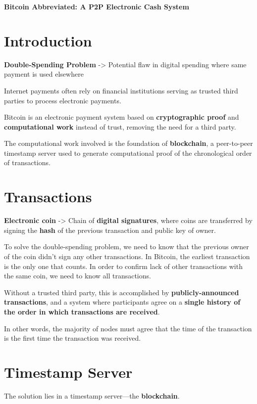 \documentclass[11pt, letterpaper]{template}
\begin{document}
{\LARGE\bfseries Bitcoin Abbreviated: A P2P Electronic Cash System \par}

\section{Introduction}

\textbf{Double-Spending Problem} -> Potential flaw in digital spending where same payment is used elsewhere

Internet payments often rely on financial institutions serving as trusted third parties to process electronic payments.

Bitcoin is an electronic payment system based on \textbf{cryptographic proof} and \textbf{computational work} instead of trust, removing the need for a third party. 

The computational work involved is the foundation of \textbf{blockchain}, a peer-to-peer timestamp server used to generate computational proof of the chronological order of transactions.

\section{Transactions}

\textbf{Electronic coin} -> Chain of \textbf{digital signatures}, where coins are transferred by signing the \textbf{hash} of the previous transaction and public key of owner.

To solve the double-spending problem, we need to know that the previous owner of the coin didn't sign any other transactions. In Bitcoin, the earliest transaction is the only one that counts. In order to confirm lack of other transactions with the same coin, we need to know all transactions. 

Without a trusted third party, this is accomplished by \textbf{publicly-announced transactions}, and a system where participants agree on a \textbf{single history of the order in which transactions are received}. 

In other words, the majority of nodes must agree that the time of the transaction is the first time the transaction was received.

\section{Timestamp Server}

The solution lies in a timestamp server---the \textbf{blockchain}.
\end{document}
